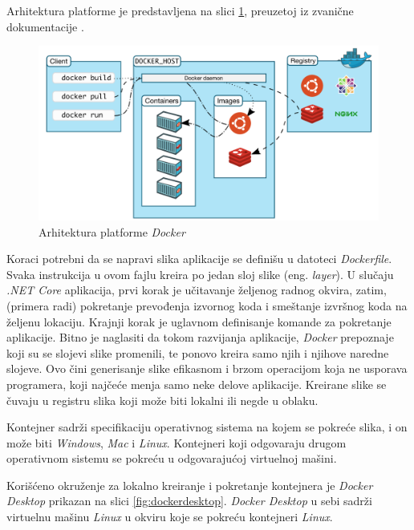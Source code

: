 \documentclass[12pt,oneside]{memoir}
\begin{document}
Arhitektura platforme je predstavljena na slici \ref{fig:dockerarch}, preuzetoj iz zvanične dokumentacije \cite{DockerArch}. 

\begin{figure}[!ht]
  \centering
  \includegraphics[width=1.0\textwidth]{./images/docker_architecture.png}
  \caption{Arhitektura platforme \emph{Docker}}
  \label{fig:dockerarch}
\end{figure}

Koraci potrebni da se napravi slika aplikacije se definišu u datoteci \emph{Dockerfile}. Svaka instrukcija u ovom fajlu kreira po jedan sloj slike (eng. \emph{layer}). U slučaju \emph{.NET Core} aplikacija, prvi korak je učitavanje željenog radnog okvira, zatim, (primera radi) pokretanje prevođenja izvornog koda i smeštanje izvršnog koda na željenu lokaciju. Krajnji korak je uglavnom definisanje komande za pokretanje aplikacije. Bitno je naglasiti da tokom razvijanja aplikacije, \emph{Docker} prepoznaje koji su se slojevi slike promenili, te ponovo kreira samo njih i njihove naredne slojeve. Ovo čini generisanje slike efikasnom i brzom operacijom koja ne usporava programera, koji najčeće menja samo neke delove aplikacije. Kreirane slike se čuvaju u registru slika koji može biti lokalni ili negde u oblaku.

Kontejner sadrži specifikaciju operativnog sistema na kojem se pokreće slika, i on može biti \emph{Windows}, \emph{Mac} i \emph{Linux}. Kontejneri koji odgovaraju drugom operativnom sistemu se pokreću u odgovarajućoj virtuelnoj mašini.

Korišćeno okruženje za lokalno kreiranje i pokretanje kontejnera je \emph{Docker Desktop} \cite{DockerDesktop} prikazan na slici \ref{fig:dockerdesktop}. \emph{Docker Desktop} u sebi sadrži virtuelnu mašinu \emph{Linux} u okviru koje se pokreću kontejneri \emph{Linux}.
\end{document}

